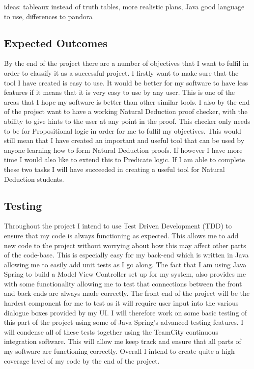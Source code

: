 ideas: tableaux instead of truth tables, more realistic plans, Java good language to use, differences to pandora
\subsection{Expected Outcomes}

By the end of the project there are a number of objectives that I want to fulfil in order to classify it as a successful project. I firstly want to make sure that the tool I have created is easy to use. It would be better for my software to have less features if it means that it is very easy to use by any user. This is one of the areas that I hope my software is better than other similar tools. I also by the end of the project want to have a working Natural Deduction proof checker, with the ability to give hints to the user at any point in the proof. This checker only needs to be for Propositional logic in order for me to fulfil my objectives. This would still mean that I have created an important and useful tool that can be used by anyone learning how to form Natural Deduction proofs. If however I have more time I would also like to extend this to Predicate logic. If I am able to complete these two tasks I will have succeeded in creating a useful tool for Natural Deduction students.

\subsection{Testing}

Throughout the project I intend to use Test Driven Development (TDD) to ensure that my code is always functioning as expected. This allows me to add new code to the project without worrying about how this may affect other parts of the code-base. This is especially easy for my back-end which is written in Java allowing me to easily add unit tests as I go along. The fact that I am using Java Spring to build a Model View Controller set up for my system, also provides me with some functionality allowing me to test that connections between the front and back ends are always made correctly. The front end of the project will be the hardest component for me to test as it will require user input into the various dialogue boxes provided by my UI. I will therefore work on some basic testing of this part of the project using some of Java Spring's advanced testing features. I will condense all of these tests together using the TeamCity continuous integration software. This will allow me keep track and ensure that all parts of my software are functioning correctly. Overall I intend to create quite a high coverage level of my code by the end of the project. 

